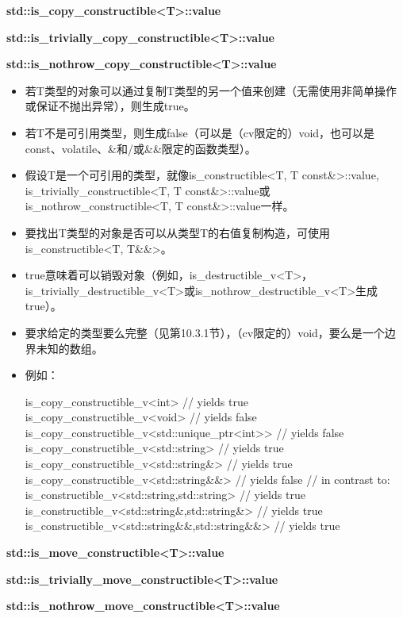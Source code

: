 \textbf{std::is\_copy\_constructible<T>::value}

\textbf{std::is\_trivially\_copy\_constructible<T>::value}

\textbf{std::is\_nothrow\_copy\_constructible<T>::value}

\begin{itemize}
\item 
若T类型的对象可以通过复制T类型的另一个值来创建（无需使用非简单操作或保证不抛出异常），则生成true。

\item 
若T不是可引用类型，则生成false（可以是（cv限定的）void，也可以是const、volatile、\&和/或\&\&限定的函数类型）。

\item 
假设T是一个可引用的类型，就像is\_constructible<T, T const\&>::value, is\_trivially\_constructible<T, T const\&>::value或is\_nothrow\_constructible<T, T const\&>::value一样。

\item 
要找出T类型的对象是否可以从类型T的右值复制构造，可使用is\_constructible<T, T\&\&>。

\item 
true意味着可以销毁对象（例如，is\_destructible\_v<T>，is\_trivially\_destructible\_v<T>或is\_nothrow\_destructible\_v<T>生成true）。

\item 
要求给定的类型要么完整（见第10.3.1节），（cv限定的）void，要么是一个边界未知的数组。

\item 
例如：
\begin{cpp}
is_copy_constructible_v<int> // yields true
is_copy_constructible_v<void> // yields false
is_copy_constructible_v<std::unique_ptr<int>> // yields false
is_copy_constructible_v<std::string> // yields true
is_copy_constructible_v<std::string&> // yields true
is_copy_constructible_v<std::string&&> // yields false
// in contrast to:
is_constructible_v<std::string,std::string> // yields true
is_constructible_v<std::string&,std::string&> // yields true
is_constructible_v<std::string&&,std::string&&> // yields true
\end{cpp}

\end{itemize}

\textbf{std::is\_move\_constructible<T>::value}

\textbf{std::is\_trivially\_move\_constructible<T>::value}

\textbf{std::is\_nothrow\_move\_constructible<T>::value}

